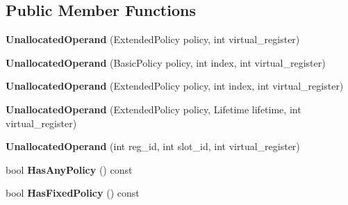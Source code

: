 \subsection*{Public Member Functions}
\begin{DoxyCompactItemize}
\item 
{\bfseries Unallocated\+Operand} (Extended\+Policy policy, int virtual\+\_\+register)\hypertarget{classv8_1_1internal_1_1compiler_1_1_unallocated_operand_a09ee7f2f68a6d1751078ff560a1ae955}{}\label{classv8_1_1internal_1_1compiler_1_1_unallocated_operand_a09ee7f2f68a6d1751078ff560a1ae955}

\item 
{\bfseries Unallocated\+Operand} (Basic\+Policy policy, int index, int virtual\+\_\+register)\hypertarget{classv8_1_1internal_1_1compiler_1_1_unallocated_operand_acdf0ed6d5291def55bcdec6ab7bb636a}{}\label{classv8_1_1internal_1_1compiler_1_1_unallocated_operand_acdf0ed6d5291def55bcdec6ab7bb636a}

\item 
{\bfseries Unallocated\+Operand} (Extended\+Policy policy, int index, int virtual\+\_\+register)\hypertarget{classv8_1_1internal_1_1compiler_1_1_unallocated_operand_a6beb02444339e3ccafb58871cdb4805e}{}\label{classv8_1_1internal_1_1compiler_1_1_unallocated_operand_a6beb02444339e3ccafb58871cdb4805e}

\item 
{\bfseries Unallocated\+Operand} (Extended\+Policy policy, Lifetime lifetime, int virtual\+\_\+register)\hypertarget{classv8_1_1internal_1_1compiler_1_1_unallocated_operand_a0e5021406571fee14a5af045172c1dc5}{}\label{classv8_1_1internal_1_1compiler_1_1_unallocated_operand_a0e5021406571fee14a5af045172c1dc5}

\item 
{\bfseries Unallocated\+Operand} (int reg\+\_\+id, int slot\+\_\+id, int virtual\+\_\+register)\hypertarget{classv8_1_1internal_1_1compiler_1_1_unallocated_operand_a2cb78df70133d2bb2454de2028d62265}{}\label{classv8_1_1internal_1_1compiler_1_1_unallocated_operand_a2cb78df70133d2bb2454de2028d62265}

\item 
bool {\bfseries Has\+Any\+Policy} () const \hypertarget{classv8_1_1internal_1_1compiler_1_1_unallocated_operand_ab11cfac89396b6c1312e8c7de166f987}{}\label{classv8_1_1internal_1_1compiler_1_1_unallocated_operand_ab11cfac89396b6c1312e8c7de166f987}

\item 
bool {\bfseries Has\+Fixed\+Policy} () const \hypertarget{classv8_1_1internal_1_1compiler_1_1_unallocated_operand_ac9c72170f344f78530446980c0f89063}{}\label{classv8_1_1internal_1_1compiler_1_1_unallocated_operand_ac9c72170f344f78530446980c0f89063}


\end{DoxyCompactItemize}
